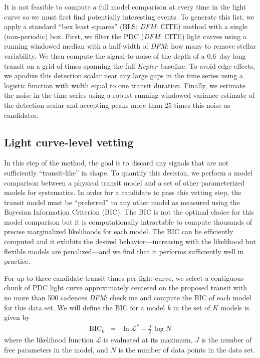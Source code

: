 \documentclass[onecolumn]{aastex6}
\newcommand{\project}[1]{\textsl{#1}}
\newcommand{\kepler}{\project{Kepler}}
\newcommand{\todo}[3]{{\color{#2}\emph{#1}: #3}}
\newcommand{\dfmtodo}[1]{\todo{DFM}{red}{#1}}
\begin{document}
It is not feasible to compute a full model comparison at every time in the
light curve so we must first find potentially interesting events.
To generate this list, we apply a standard ``box least squares'' (BLS;
\dfmtodo{CITE}) method with a single (non-periodic) box.
First, we filter the PDC (\dfmtodo{CITE}) light curves using a running
windowed median with a half-width of \dfmtodo{how many} to remove stellar
variability.
We then compute the signal-to-noise of the depth of a 0.6~day long transit on
a grid of times spanning the full \kepler\ baseline.
To avoid edge effects, we apodize this detection scalar near any large gaps in
the time series using a logistic function with width equal to one transit
duration.
Finally, we estimate the noise in the time series using a robust running
windowed variance estimate of the detection scalar and accepting peaks more
than 25-times this noise as candidates.

\subsection{Light curve-level vetting}

In this step of the method, the goal is to discard any signals that are not
sufficiently ``transit-like'' in shape.
To quantify this decision, we perform a model comparison between a physical
transit model and a set of other parameterized models for systematics.
In order for a candidate to pass this vetting step, the transit model must be
``preferred'' to any other model as measured using the Bayesian Information
Criterion (BIC).
The BIC is not the optimal choice for this model comparison but it is
computationally intractable to compute thousands of precise marginalized
likelihoods for each model.
The BIC can be efficiently computed and it exhibits the desired
behavior---increasing with the likelihood but flexible models are
penalized---and we find that it performs sufficiently well in practice.

For up to three candidate transit times per light curve, we select a
contiguous chunk of PDC light curve approximately centered on the proposed
transit with no more than 500 cadences \dfmtodo{check me} and compute the BIC
of each model for this data set.
We will define the BIC for a model $k$ in the set of $K$ models is given by
\begin{eqnarray}
\mathrm{BIC}_k &=& \ln \mathcal{L}^* - \frac{J}{2}\,\log N
\end{eqnarray}
where the likelihood function $\mathcal{L}$ is evaluated at its maximum, $J$
is the number of free parameters in the model, and $N$ is the number of
data points in the data set.
\end{document}
